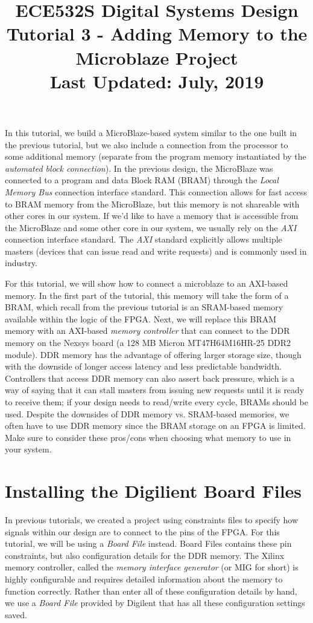 \documentclass[11pt]{article}
\title{ECE532S Digital Systems Design \\ \vspace{0.4cm}
       \Large Tutorial 3 - Adding Memory to the Microblaze Project \\ \vspace{0.4cm}
       \small Last Updated: July, 2019}
\author{ }
\date{ }
\begin{document}
\maketitle
\vspace{-1cm}

In this tutorial, we build a MicroBlaze-based system similar to the one built in the previous tutorial, but we also include a connection from the processor to some additional memory (separate from the program memory instantiated by the \textit{automated block connection}). In the previous design, the MicroBlaze was connected to a program and data Block RAM (BRAM) through the \textit{Local Memory Bus} connection interface standard. This connection allows for fast access to BRAM memory from the MicroBlaze, but this memory is not shareable with other cores in our system. If we'd like to have a memory that is accessible from the MicroBlaze and some other core in our system, we usually rely on the \textit{AXI} connection interface standard. The \textit{AXI} standard explicitly allows multiple masters (devices that can issue read and write requests) and is commonly used in industry.

For this tutorial, we will show how to connect a microblaze to an AXI-based memory. In the first part of the tutorial, this memory will take the form of a BRAM, which recall from the previous tutorial is an SRAM-based memory available within the logic of the FPGA. Next, we will replace this BRAM memory with an AXI-based \textit{memory controller} that can connect to the DDR memory on the Nexsys board (a 128 MB Micron MT47H64M16HR-25 DDR2 module). DDR memory has the advantage of offering larger storage size, though with the downside of longer access latency and less predictable bandwidth. Controllers that access DDR memory can also assert back pressure, which is a way of saying that it can stall masters from issuing new requests until it is ready to receive them; if your design needs to read/write every cycle, BRAMs should be used. Despite the downsides of DDR memory vs. SRAM-based memories, we often have to use DDR memory since the BRAM storage on an FPGA is limited. Make sure to consider these pros/cons when choosing what memory to use in your system.




\section{Installing the Digilient Board Files}
\label{sec:board_file}
In previous tutorials, we created a project using constraints files to specify how signals within our design are to connect to the pins of the FPGA. For this tutorial, we will be using a \textit{Board File} instead. Board Files contains these pin constraints, but also configuration details for the DDR memory. The Xilinx memory controller, called the \textit{memory interface generator} (or MIG for short) is highly configurable and requires detailed information about the memory to function correctly. Rather than enter all of these configuration details by hand, we use a \textit{Board File} provided by Digilent that has all these configuration settings saved.
\end{document}
